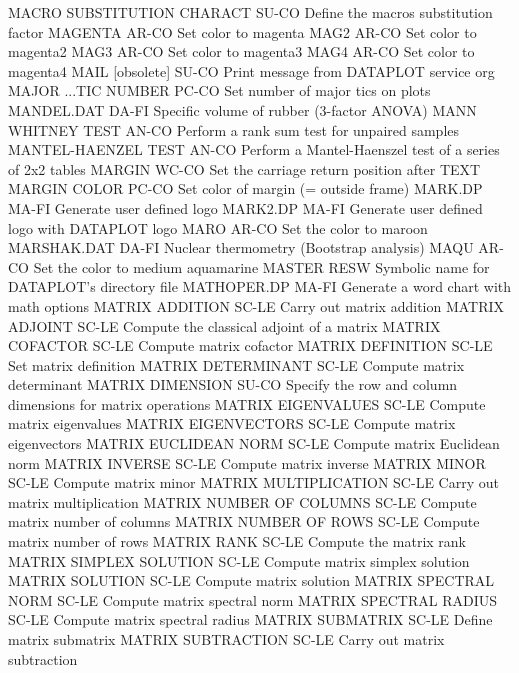 MACRO SUBSTITUTION CHARACT  SU-CO Define the macros substitution factor
MAGENTA                     AR-CO Set color to magenta
MAG2                        AR-CO Set color to magenta2
MAG3                        AR-CO Set color to magenta3
MAG4                        AR-CO Set color to magenta4
MAIL [obsolete]             SU-CO Print message from DATAPLOT service org
MAJOR ...TIC NUMBER         PC-CO Set number of major tics on plots
MANDEL.DAT                  DA-FI Specific volume of rubber (3-factor ANOVA)
MANN WHITNEY TEST           AN-CO Perform a rank sum test for unpaired samples
MANTEL-HAENZEL TEST         AN-CO Perform a Mantel-Haenszel test of a series of 2x2 tables
MARGIN                      WC-CO Set the carriage return position after TEXT
MARGIN COLOR                PC-CO Set color of margin (= outside frame)
MARK.DP                     MA-FI Generate user defined logo
MARK2.DP                    MA-FI Generate user defined logo with DATAPLOT logo
MARO                        AR-CO Set the color to maroon
MARSHAK.DAT                 DA-FI Nuclear thermometry (Bootstrap analysis)
MAQU                        AR-CO Set the color to medium aquamarine
MASTER                      RESW  Symbolic name for DATAPLOT's directory file
MATHOPER.DP                 MA-FI Generate a word chart with math options
MATRIX ADDITION             SC-LE Carry out matrix addition
MATRIX ADJOINT              SC-LE Compute the classical adjoint of a matrix
MATRIX COFACTOR             SC-LE Compute matrix cofactor
MATRIX DEFINITION           SC-LE Set matrix definition
MATRIX DETERMINANT          SC-LE Compute matrix determinant
MATRIX DIMENSION            SU-CO Specify the row and column dimensions for matrix operations
MATRIX EIGENVALUES          SC-LE Compute matrix eigenvalues
MATRIX EIGENVECTORS         SC-LE Compute matrix eigenvectors
MATRIX EUCLIDEAN NORM       SC-LE Compute matrix Euclidean norm
MATRIX INVERSE              SC-LE Compute matrix inverse
MATRIX MINOR                SC-LE Compute matrix minor
MATRIX MULTIPLICATION       SC-LE Carry out matrix multiplication
MATRIX NUMBER OF COLUMNS    SC-LE Compute matrix number of columns
MATRIX NUMBER OF ROWS       SC-LE Compute matrix number of rows
MATRIX RANK                 SC-LE Compute the matrix rank
MATRIX SIMPLEX SOLUTION     SC-LE Compute matrix simplex solution
MATRIX SOLUTION             SC-LE Compute matrix solution
MATRIX SPECTRAL NORM        SC-LE Compute matrix spectral norm
MATRIX SPECTRAL RADIUS      SC-LE Compute matrix spectral radius
MATRIX SUBMATRIX            SC-LE Define matrix submatrix
MATRIX SUBTRACTION          SC-LE Carry out matrix subtraction
